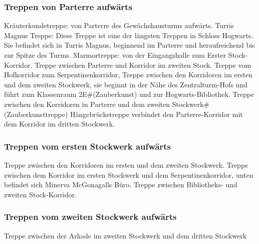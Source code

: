 \documentclass[a4paper, 10pt]{article}
\begin{document}
\subsubsection*{\large Treppen von Parterre aufwärts}
Kräuterkundetreppe: von Parterre des Gewächshausturms aufwärts.
\vspace{10pt}
\newline
{}  
Turris Magnus Treppe: Diese Treppe ist eine der längsten Treppen in Schloss Hogwarts. Sie befindet sich in Turris Magnus, beginnend im Parterre und heraufreichend bis zur Spitze des Turms.
\vspace{10pt}
\newline
{}  
Marmortreppe: von der Eingangshalle zum Erster Stock-Korridor.
\vspace{10pt}
\newline
{}  
Treppe zwischen Parterre und Korridor im zweiten Stock.
\vspace{10pt}
\newline
{}  
Treppe vom Hofkorridor zum Serpentinenkorridor,
\vspace{10pt}
\newline
{}  
Treppe zwischen den Korridoren im ersten und dem zweiten Stockwerk, sie beginnt in der Nähe des Zentralturm-Hofs und führt zum Klassenraum 2E#(Zauberkunst) und zur Hogwarts-Bibliothek.
\vspace{10pt}
\newline
{}  
Treppe zwischen den Korridoren in Parterre und dem zweiten Stockwerk#(Zauberkunsttreppe)
Hängebrücketreppe verbindet den Parterre-Korridor mit dem Korridor im dritten Stockwerk.
\subsubsection*{\large Treppen vom ersten Stockwerk aufwärts}
Treppe zwischen den Korridoren im ersten und dem zweiten Stockwerk.
\vspace{10pt}
\newline
{}  
Treppe zwischen dem Korridor im ersten Stockwerk und dem Serpentinenkorridor, unten befindet sich Minerva McGonagalls Büro.
\vspace{10pt}
\newline
{}  
Treppe zwischen Bibliotheks- und zweiten Stock-Korridor.
\subsubsection*{\large Treppen vom zweiten Stockwerk aufwärts}
Treppe zwischen der Arkade im zweiten Stockwerk und dem dritten Stockwerk
\end{document}
